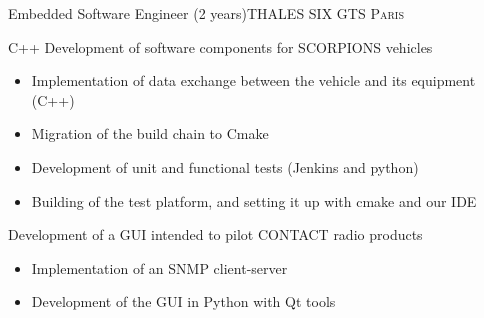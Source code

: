\documentclass[10pt,a4paper]{moderncv}
\begin{document}
{Embedded Software Engineer (2 years)}{THALES SIX GTS}
{\textsc{Paris}}
{}
{C++ Development of software components for SCORPIONS vehicles
\begin{itemize}
\item Implementation of data exchange between the vehicle and its equipment (C++)
\item Migration of the build chain to Cmake
\item Development of unit and functional tests (Jenkins and python)
\item Building of the test platform, and setting it up with cmake and our IDE
\end{itemize}
Development of a GUI intended to pilot CONTACT radio products
\begin{itemize}
\item Implementation of an SNMP client-server
\item Development of the GUI in Python with Qt tools
\end{itemize}
}
\end{document}
